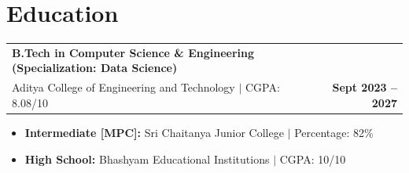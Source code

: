 \documentclass[9.5pt, letterpaper]{article}
\makeatletter
\newcommand{\dateright}[2]{%
  \begin{tabularx}{\linewidth}{@{}X r@{}}
    #1 & \textbf{\small #2}
  \end{tabularx}}
\makeatother
\begin{document}
\vspace{2pt}

\section{Education}

\dateright{%
  \textbf{B.Tech in Computer Science \& Engineering (Specialization: Data Science)}\\
  Aditya College of Engineering and Technology $|$ CGPA: 8.08/10
}{Sept 2023 -- 2027}
\begin{itemize}
  \item \textbf{Intermediate [MPC]:} Sri Chaitanya Junior College $|$ Percentage: 82\%
  \item \textbf{High School:} Bhashyam Educational Institutions $|$ CGPA: 10/10
\end{itemize}

\vspace{2pt}

\end{document}
